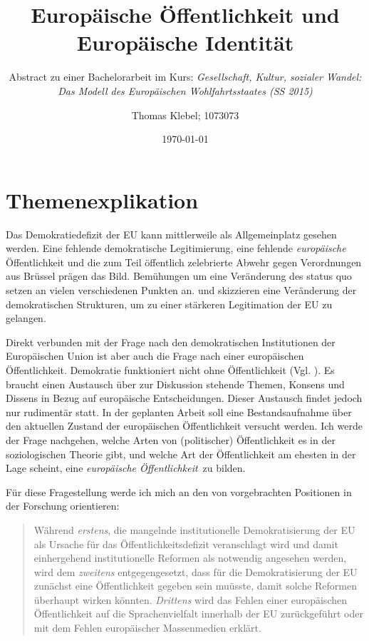 \documentclass[a4paper, german, oneside]{scrartcl}
\date{\displaydate{date}}
\title{Europäische Öffentlichkeit und Europäische Identität}
\subtitle{Abstract zu einer Bachelorarbeit im Kurs: \emph{Gesellschaft, Kultur, sozialer Wandel: Das Modell des Europäischen Wohlfahrtsstaates (SS 2015)}}
\date{\today}
\author{Thomas Klebel; 1073073}
\newcommand{\citet}[1]{\textcite{#1}}
\begin{document}
\maketitle

\section{Themenexplikation}
Das Demokratiedefizit der EU kann mittlerweile als Allgemeinplatz gesehen werden. Eine fehlende demokratische Legitimierung, eine fehlende \emph{europäische} Öffentlichkeit und die zum Teil öffentlich zelebrierte Abwehr gegen Verordnungen aus Brüssel prägen das Bild. Bemühungen um eine Veränderung des status quo setzen an vielen verschiedenen Punkten an. \citet{grozelier_democracy_2013_habermas} und \citet{grozelier_europes_2013_hill} skizzieren eine Veränderung der demokratischen Strukturen, um zu einer stärkeren Legitimation der EU zu gelangen.

Direkt verbunden mit der Frage nach den demokratischen Institutionen der Europäischen Union ist aber auch die Frage nach einer europäischen Öffentlichkeit. Demokratie funktioniert nicht ohne Öffentlichkeit (Vgl. \textcite[32]{schildberg_politische_2010}). Es braucht einen Austausch über zur Diskussion stehende Themen, Konsens und Dissens in Bezug auf europäische Entscheidungen. Dieser Austausch findet jedoch nur rudimentär statt. In der geplanten Arbeit soll eine Bestandsaufnahme über den aktuellen Zustand der europäischen Öffentlichkeit versucht werden. Ich werde der Frage nachgehen, welche Arten von (politischer) Öffentlichkeit es in der soziologischen Theorie gibt, und welche Art der Öffentlichkeit am ehesten in der Lage scheint, eine \emph{europäische Öffentlichkeit} zu bilden.

Für diese Fragestellung werde ich mich an den von \citet{schildberg_politische_2010} vorgebrachten Positionen in der Forschung orientieren: \blockquote[{\cite[32]{schildberg_politische_2010}}]{Während \emph{erstens}, die mangelnde institutionelle Demokratisierung der EU als Ursache für das Öffentlichkeitsdefizit veranschlagt wird und damit einhergehend institutionelle Reformen als notwendig angesehen werden, wird dem \emph{zweitens} entgegengesetzt, dass für die Demokratisierung der EU zunächst eine Öffentlichkeit gegeben sein muüsste, damit solche Reformen überhaupt wirken könnten. \emph{Drittens} wird das Fehlen einer europäischen Öffentlichkeit auf die Sprachenvielfalt innerhalb der EU zurückgeführt oder mit dem Fehlen europäischer Massenmedien erklärt.}
\end{document}
